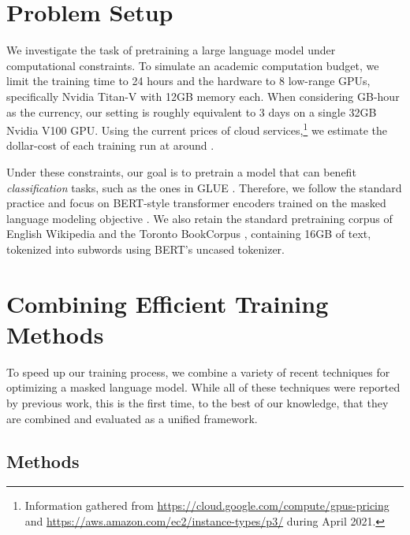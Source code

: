 \documentclass[11pt]{article}
\begin{document}
 \section{Problem Setup}
\label{sec:problem}

We investigate the task of pretraining a large language model under computational constraints.
To simulate an academic computation budget, we limit the training time to 24 hours and the hardware to 8 low-range GPUs, specifically Nvidia Titan-V with 12GB memory each.
When considering GB-hour as the currency, our setting is roughly equivalent to 3 days on a single 32GB Nvidia V100 GPU.
Using the current prices of cloud services,\footnote{Information gathered from \url{https://cloud.google.com/compute/gpus-pricing} and \url{https://aws.amazon.com/ec2/instance-types/p3/} during April 2021.} we estimate the dollar-cost of each training run at around .

Under these constraints, our goal is to pretrain a model that can benefit \textit{classification} tasks, such as the ones in GLUE \cite{wang-etal-2018-glue}.
Therefore, we follow the standard practice and focus on BERT-style transformer encoders trained on the masked language modeling objective \cite{devlin-etal-2019-bert}.
We also retain the standard pretraining corpus of English Wikipedia and the Toronto BookCorpus \cite{zhu2015aligning}, containing 16GB of text, tokenized into subwords using BERT's uncased tokenizer.
 \section{Combining Efficient Training Methods}
\label{sec:methods}

To speed up our training process, we combine a variety of recent techniques for optimizing a masked language model.
While all of these techniques were reported by previous work, this is the first time, to the best of our knowledge, that they are combined and evaluated as a unified framework.

\subsection{Methods}
\label{sec:methods-methods}
\end{document}
